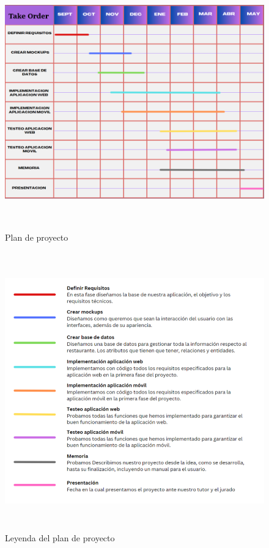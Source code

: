 \begin{figure}[h]
\centering
\includegraphics[width=15cm, height=11cm]{Imagenes/Figuras/Diagrama de Gantt.png}
\caption{Plan de proyecto}\label{fig:Diagrama de Gantt}
\end{figure} 


\begin{figure}[h]
\centering
\includegraphics[width=15cm, height=12cm]{Imagenes/Figuras/leyenda Gantt.png}
\caption{Leyenda del plan de proyecto}\label{fig:Leyenda diagrama de Gantt}
\end{figure} 

